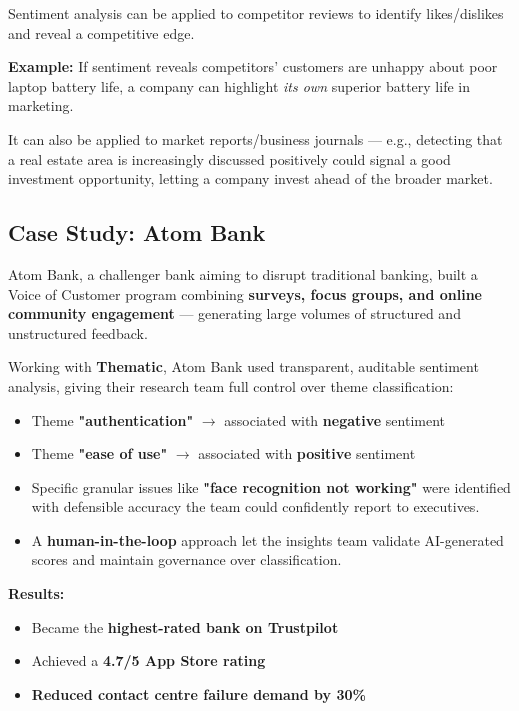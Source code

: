 \documentclass[12pt,openany]{book}
\begin{document}
Sentiment analysis can be applied to competitor reviews to identify likes/dislikes and reveal a competitive edge.

\textbf{Example:} If sentiment reveals competitors' customers are unhappy about poor laptop battery life, a company can highlight \textit{its own} superior battery life in marketing.

It can also be applied to market reports/business journals --- e.g., detecting that a real estate area is increasingly discussed positively could signal a good investment opportunity, letting a company invest ahead of the broader market.

\subsection{Case Study: Atom Bank}

Atom Bank, a challenger bank aiming to disrupt traditional banking, built a Voice of Customer program combining \textbf{surveys, focus groups, and online community engagement} --- generating large volumes of structured and unstructured feedback.

Working with \textbf{Thematic}, Atom Bank used transparent, auditable sentiment analysis, giving their research team full control over theme classification:
\begin{itemize}[leftmargin=*]
    \item Theme \textbf{"authentication"} \(\rightarrow\) associated with \textbf{negative} sentiment
    \item Theme \textbf{"ease of use"} \(\rightarrow\) associated with \textbf{positive} sentiment
    \item Specific granular issues like \textbf{"face recognition not working"} were identified with defensible accuracy the team could confidently report to executives.
    \item A \textbf{human-in-the-loop} approach let the insights team validate AI-generated scores and maintain governance over classification.
\end{itemize}

\textbf{Results:}
\begin{itemize}[leftmargin=*]
    \item Became the \textbf{highest-rated bank on Trustpilot}
    \item Achieved a \textbf{4.7/5 App Store rating}
    \item \textbf{Reduced contact centre failure demand by 30\%}
\end{itemize}
\end{document}
